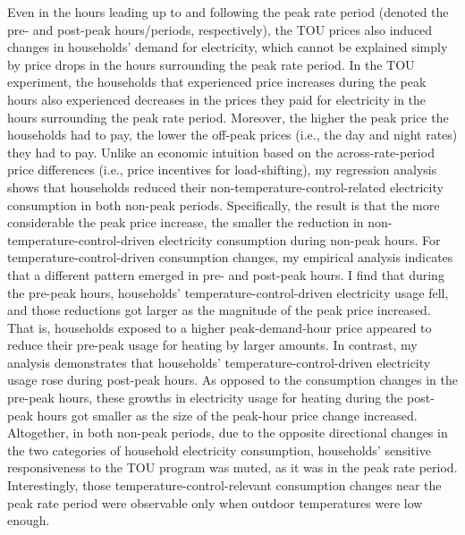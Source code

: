 Even in the hours leading up to and following the peak rate period (denoted the pre- and post-peak hours/periods, respectively), the TOU prices also induced changes in households' demand for electricity, which cannot be explained simply by price drops in the hours surrounding the peak rate period. In the TOU experiment, the households that experienced price increases during the peak hours also experienced decreases in the prices they paid for electricity in the hours surrounding the peak rate period. Moreover, the higher the peak price the households had to pay, the lower the off-peak prices (i.e., the day and night rates) they had to pay. Unlike an economic intuition based on the across-rate-period price differences (i.e., price incentives for load-shifting), my regression analysis shows that households reduced their non-temperature-control-related electricity consumption in both non-peak periods. Specifically, the result is that the more considerable the peak price increase, the smaller the reduction in non-temperature-control-driven electricity consumption during non-peak hours. For temperature-control-driven consumption changes, my empirical analysis indicates that a different pattern emerged in pre- and post-peak hours. I find that during the pre-peak hours, households' temperature-control-driven electricity usage fell, and those reductions got larger as the magnitude of the peak price increased. That is, households exposed to a higher peak-demand-hour price appeared to reduce their pre-peak usage for heating by larger amounts. In contrast, my analysis demonstrates that households' temperature-control-driven electricity usage rose during post-peak hours. As opposed to the consumption changes in the pre-peak hours, these growths in electricity usage for heating during the post-peak hours got smaller as the size of the peak-hour price change increased. Altogether, in both non-peak periods, due to the opposite directional changes in the two categories of household electricity consumption, households' sensitive responsiveness to the TOU program was muted, as it was in the peak rate period. Interestingly, those temperature-control-relevant consumption changes near the peak rate period were observable only when outdoor temperatures were low enough. 

